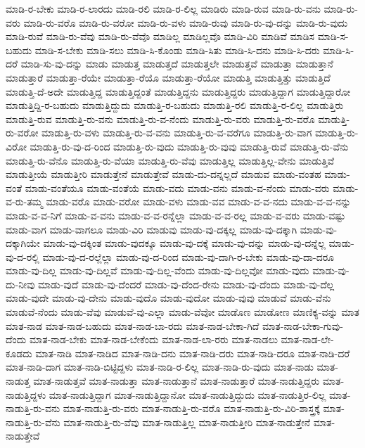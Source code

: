 {ಮಾಡಿ-ರ-ಬೇಕು
ಮಾಡಿ-ರ-ಲಾರದು
ಮಾಡಿ-ರಲಿ
ಮಾಡಿ-ರ-ಲಿಲ್ಲ
ಮಾಡಿರು
ಮಾಡಿ-ರುವ
ಮಾಡಿ-ರು-ವನು
ಮಾಡಿ-ರು-ವರು
ಮಾಡಿ-ರು-ವರೊ
ಮಾಡಿ-ರು-ವರೋ
ಮಾಡಿ-ರು-ವಳು
ಮಾಡಿ-ರುವು
ಮಾಡಿ-ರು-ವು-ದನ್ನು
ಮಾಡಿ-ರು-ವುದು
ಮಾಡಿ-ರುವೆ
ಮಾಡಿ-ರು-ವೆವು
ಮಾಡಿ-ರು-ವೆವೊ
ಮಾಡಿಲ್ಲ
ಮಾಡಿಲ್ಲವೊ
ಮಾಡಿ-ವಿರಿ
ಮಾಡಿವೆ
ಮಾಡಿಸ
ಮಾಡಿ-ಸ-ಬಹುದು
ಮಾಡಿ-ಸ-ಬೇಕು
ಮಾಡಿ-ಸಲು
ಮಾಡಿ-ಸಿ-ಕೊಂಡು
ಮಾಡಿ-ಸಿತು
ಮಾಡಿ-ಸಿ-ದನು
ಮಾಡಿ-ಸಿ-ದರು
ಮಾಡಿ-ಸಿ-ದರೆ
ಮಾಡಿ-ಸು-ವು-ದನ್ನು
ಮಾಡು
ಮಾಡುತ್ತ
ಮಾಡುತ್ತದೆ
ಮಾಡುತ್ತಲೇ
ಮಾಡುತ್ತವೆ
ಮಾಡುತ್ತಾ
ಮಾಡುತ್ತಾನೆ
ಮಾಡುತ್ತಾರೆ
ಮಾಡುತ್ತಾ-ರೆಯೇ
ಮಾಡುತ್ತಾ-ರೆಯೊ
ಮಾಡುತ್ತಾ-ರೆಯೋ
ಮಾಡುತ್ತಿ
ಮಾಡುತ್ತಿತ್ತು
ಮಾಡುತ್ತಿದೆ
ಮಾಡುತ್ತಿ-ದೆ-ಅದೇ
ಮಾಡುತ್ತಿದ್ದ
ಮಾಡುತ್ತಿದ್ದಂತೆ
ಮಾಡುತ್ತಿದ್ದನು
ಮಾಡುತ್ತಿದ್ದರು
ಮಾಡುತ್ತಿದ್ದಾಗ
ಮಾಡುತ್ತಿದ್ದಾರೋ
ಮಾಡುತ್ತಿದ್ದಿ-ರ-ಬಹುದು
ಮಾಡುತ್ತಿದ್ದುದು
ಮಾಡುತ್ತಿ-ರ-ಬಹುದು
ಮಾಡುತ್ತಿ-ರಲಿ
ಮಾಡುತ್ತಿ-ರ-ಲಿಲ್ಲ
ಮಾಡುತ್ತಿರು
ಮಾಡುತ್ತಿ-ರುವ
ಮಾಡುತ್ತಿ-ರು-ವನು
ಮಾಡುತ್ತಿ-ರು-ವ-ನೆಂದು
ಮಾಡುತ್ತಿ-ರು-ವರು
ಮಾಡುತ್ತಿ-ರು-ವರೊ
ಮಾಡುತ್ತಿ-ರು-ವರೋ
ಮಾಡುತ್ತಿ-ರು-ವಳು
ಮಾಡುತ್ತಿ-ರು-ವ-ವನು
ಮಾಡುತ್ತಿ-ರು-ವ-ವರೆಗೂ
ಮಾಡುತ್ತಿ-ರು-ವಾಗ
ಮಾಡುತ್ತಿ-ರು-ವಿರೋ
ಮಾಡುತ್ತಿ-ರು-ವು-ದ-ರಿಂದ
ಮಾಡುತ್ತಿ-ರು-ವುದು
ಮಾಡುತ್ತಿ-ರು-ವುವು
ಮಾಡುತ್ತಿ-ರುವೆ
ಮಾಡುತ್ತಿ-ರು-ವೆನು
ಮಾಡುತ್ತಿ-ರು-ವೆನೊ
ಮಾಡುತ್ತಿ-ರು-ವೆಯಾ
ಮಾಡುತ್ತಿ-ರು-ವೆವು
ಮಾಡುತ್ತಿಲ್ಲ
ಮಾಡುತ್ತಿಲ್ಲ-ವೇನು
ಮಾಡುತ್ತಿವೆ
ಮಾಡುತ್ತೀಯೆ
ಮಾಡುತ್ತೀರಿ
ಮಾಡುತ್ತೇನೆ
ಮಾಡುತ್ತೇವೆ
ಮಾಡು-ದು-ದನ್ನಲ್ಲದೆ
ಮಾಡುವ
ಮಾಡು-ವಂತಹ
ಮಾಡು-ವಂತೆ
ಮಾಡು-ವಂತೆಯೂ
ಮಾಡು-ವಂತೆಯೆ
ಮಾಡು-ವದು
ಮಾಡು-ವನು
ಮಾಡು-ವ-ನೆಂದು
ಮಾಡು-ವರು
ಮಾಡು-ವ-ರು-ತಮ್ಮ
ಮಾಡು-ವರೊ
ಮಾಡು-ವರೋ
ಮಾಡು-ವಳು
ಮಾಡು-ವವ
ಮಾಡು-ವ-ವ-ನದು
ಮಾಡು-ವ-ವ-ನನ್ನು
ಮಾಡು-ವ-ವ-ನಿಗೆ
ಮಾಡು-ವ-ವನು
ಮಾಡು-ವ-ವ-ರನ್ನೆಲ್ಲಾ
ಮಾಡು-ವ-ವ-ರಲ್ಲ
ಮಾಡು-ವ-ವರು
ಮಾಡು-ವಷ್ಟು
ಮಾಡು-ವಾಗ
ಮಾಡು-ವಾಗಲೂ
ಮಾಡು-ವಿರಿ
ಮಾಡುವು
ಮಾಡು-ವು-ದಕ್ಕಲ್ಲ
ಮಾಡು-ವು-ದಕ್ಕಾಗಿ
ಮಾಡು-ವು-ದಕ್ಕಾಗಿಯೇ
ಮಾಡು-ವು-ದಕ್ಕಿಂತ
ಮಾಡು-ವುದಕ್ಕೂ
ಮಾಡು-ವು-ದಕ್ಕೆ
ಮಾಡು-ವು-ದನ್ನು
ಮಾಡು-ವು-ದನ್ನೆಲ್ಲ
ಮಾಡು-ವು-ದ-ರಲ್ಲಿ
ಮಾಡು-ವು-ದ-ರಲ್ಲೆಲ್ಲಾ
ಮಾಡು-ವು-ದ-ರಿಂದ
ಮಾಡು-ವು-ದಾಗಿ-ರ-ಬೇಕು
ಮಾಡು-ವು-ದಾ-ದರೂ
ಮಾಡು-ವು-ದಿಲ್ಲ
ಮಾಡು-ವು-ದಿಲ್ಲವೆ
ಮಾಡು-ವು-ದಿಲ್ಲ-ವೆಂದು
ಮಾಡು-ವು-ದಿಲ್ಲವೋ
ಮಾಡು-ವುದು
ಮಾಡು-ವು-ದು-ನೀವು
ಮಾಡು-ವುದೆ
ಮಾಡು-ವು-ದೆಂದರೆ
ಮಾಡು-ವು-ದೆಂದ-ರೇನು
ಮಾಡು-ವು-ದೆಂದು
ಮಾಡು-ವು-ದೆಲ್ಲ
ಮಾಡು-ವುದೇ
ಮಾಡು-ವು-ದೇನು
ಮಾಡು-ವುದೊ
ಮಾಡು-ವುದೋ
ಮಾಡು-ವುವು
ಮಾಡುವೆ
ಮಾಡು-ವೆನು
ಮಾಡುವೆ-ನೆಂದು
ಮಾಡು-ವೆವು
ಮಾಡುವೆ-ವು-ಎಲ್ಲಾ
ಮಾಡು-ವೆವೋ
ಮಾಡೊಣ
ಮಾಡೋಣ
ಮಾಣಿಕ್ಯ-ವನ್ನು
ಮಾತ
ಮಾತ-ನಾಡ
ಮಾತ-ನಾಡ-ಬಹುದು
ಮಾತ-ನಾಡ-ಬಾ-ರದು
ಮಾತ-ನಾಡ-ಬೇಕಾ-ಗಿದೆ
ಮಾತ-ನಾಡ-ಬೇಕಾ-ಗುವು-ದೆಂದು
ಮಾತ-ನಾಡ-ಬೇಕು
ಮಾತ-ನಾಡ-ಬೇಕೆಂದು
ಮಾತ-ನಾಡ-ಲಾ-ರರು
ಮಾತ-ನಾಡಲು
ಮಾತ-ನಾಡ-ಲೇ-ಕೂಡದು
ಮಾತ-ನಾಡಿ
ಮಾತ-ನಾಡಿದ
ಮಾತ-ನಾಡಿ-ದನು
ಮಾತ-ನಾಡಿ-ದರು
ಮಾತ-ನಾಡಿ-ದರೂ
ಮಾತ-ನಾಡಿ-ದರೆ
ಮಾತ-ನಾಡಿ-ದಾಗ
ಮಾತ-ನಾಡಿ-ಬಿಟ್ಟಿದ್ದಳು
ಮಾತ-ನಾಡಿ-ರ-ಲಿಲ್ಲ
ಮಾತ-ನಾಡಿ-ರು-ವುದು
ಮಾತ-ನಾಡು
ಮಾತ-ನಾಡುತ್ತ
ಮಾತ-ನಾಡುತ್ತವೆ
ಮಾತ-ನಾಡುತ್ತಾ
ಮಾತ-ನಾಡುತ್ತಾನೆ
ಮಾತ-ನಾಡುತ್ತಾರೆ
ಮಾತ-ನಾಡುತ್ತಿದ್ದರು
ಮಾತ-ನಾಡುತ್ತಿದ್ದಳು
ಮಾತ-ನಾಡುತ್ತಿದ್ದಾಗ
ಮಾತ-ನಾಡುತ್ತಿದ್ದಾನೋ
ಮಾತ-ನಾಡುತ್ತಿದ್ದುದು
ಮಾತ-ನಾಡುತ್ತಿರ-ಲಿಲ್ಲ
ಮಾತ-ನಾಡುತ್ತಿ-ರು-ವನು
ಮಾತ-ನಾಡುತ್ತಿ-ರು-ವರು
ಮಾತ-ನಾಡುತ್ತಿ-ರು-ವರೊ
ಮಾತ-ನಾಡುತ್ತಿ-ರು-ವಿರಿ-ಶಾಸ್ತ್ರಕ್ಕೆ
ಮಾತ-ನಾಡುತ್ತಿ-ರು-ವೆನು
ಮಾತ-ನಾಡುತ್ತಿ-ರು-ವೆವು
ಮಾತ-ನಾಡುತ್ತಿಲ್ಲ
ಮಾತ-ನಾಡುತ್ತೀರಿ
ಮಾತ-ನಾಡುತ್ತೇನೆ
ಮಾತ-ನಾಡುತ್ತೇವೆ
}
